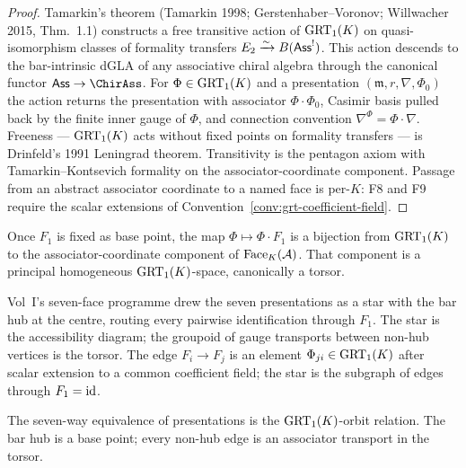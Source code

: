 \begin{proof}
Tamarkin's theorem (Tamarkin 1998; Gerstenhaber--Voronov;
Willwacher 2015, Thm.~1.1) constructs a free transitive action of
$\mathrm{GRT}_1(K)$ on quasi-isomorphism classes of formality transfers
$E_2\xrightarrow{\sim} B(\mathsf{Ass}^{!})$. This action descends to the
bar-intrinsic dGLA of any associative chiral algebra through the
canonical functor $\Ass\to\ChirAss$. For $\Phi\in\mathrm{GRT}_1(K)$ and a
presentation $(\mathfrak{m},r,\nabla,\Phi_0)$ the action returns
the presentation with associator $\Phi\cdot\Phi_0$, Casimir basis
pulled back by the finite inner gauge of $\Phi$, and connection
convention $\nabla^\Phi = \Phi\cdot\nabla$. Freeness — $\mathrm{GRT}_1(K)$
acts without fixed points on formality transfers — is Drinfeld's
1991 Leningrad theorem. Transitivity is the pentagon axiom with
Tamarkin--Kontsevich formality on the associator-coordinate
component. Passage from an abstract associator coordinate to a
named face is per-$K$: F8 and F9 require the scalar extensions of
Convention~\ref{conv:grt-coefficient-field}.
\end{proof}

\begin{corollary}
Once $F_1$ is fixed as base point, the map $\Phi\mapsto\Phi\cdot F_1$
is a bijection from $\mathrm{GRT}_1(K)$ to the associator-coordinate component of
$\mathrm{Face}_K(\mathcal{A})$. That component is a principal homogeneous
$\mathrm{GRT}_1(K)$-space, canonically a torsor.
\end{corollary}

\begin{remark}
\label{rem:torsor-vs-star}
Vol~I's seven-face programme drew the seven presentations as a
star with the bar hub at the centre, routing every pairwise
identification through $F_1$. The star is the accessibility
diagram; the groupoid of gauge transports between non-hub
vertices is the torsor. The edge $F_i\to F_j$ is an element
$\Phi_{ji}\in\mathrm{GRT}_1(K)$ after scalar extension to a common
coefficient field; the star is the subgraph of edges through
$F_1 = \mathrm{id}$.
\end{remark}

\begin{remark}
The seven-way equivalence of presentations is the
$\mathrm{GRT}_1(K)$-orbit relation. The bar hub is a base point; every
non-hub edge is an associator transport in the torsor.
\end{remark}

